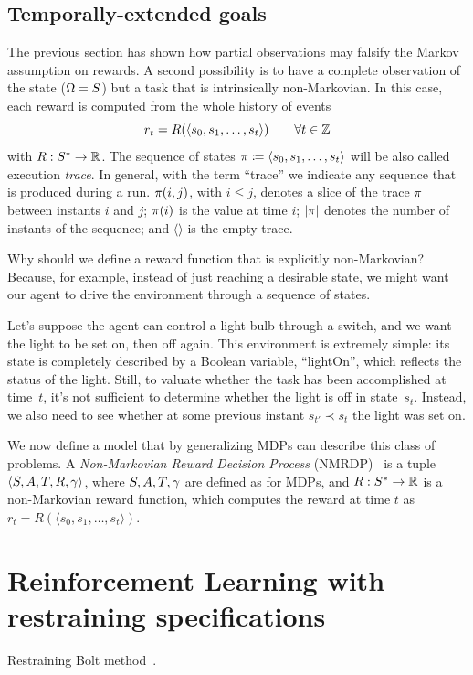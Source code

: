 \subsection{Temporally-extended goals}

The previous section has shown how partial observations may falsify the Markov
assumption on rewards. A second possibility is to have a complete observation
of the state ($\Omega = S$) but a task that is intrinsically
non-Markovian. In this case, each reward is computed from the whole history
of events
\begin{equation}
	r_t = R(\langle s_0, s_1, \dots, s_t \rangle) \qquad \forall t \in \mathbb{Z}
\end{equation}
with $R: S^* \to \mathbb{R}$. The sequence of states $\pi
\coloneqq \langle s_0, s_1, \dots, s_t \rangle$ will be also called
execution \emph{trace}. In general, with the term ``trace'' we indicate any
sequence that is produced during a run. $\pi(i, j)$, with $i \le j$,
denotes a slice of the trace $\pi$ between instants $i$ and $j$;
$\pi(i)$ is the value at time $i$; $\lvert\pi\rvert$ denotes the number of
instants of the sequence; and $\langle \rangle$ is the empty trace.

Why should we define a reward function that is explicitly non-Markovian?
Because, for example, instead of just reaching a desirable state, we might
want our agent to drive the environment through a sequence of states.

\begin{example}
	Let's suppose the agent can control a light bulb through a switch, and we
	want the light to be set on, then off again. This environment is extremely
	simple: its state is completely described by a Boolean variable,
	``lightOn'', which reflects the status of the light. Still, to valuate
	whether the task has been accomplished at time~$t$, it's not sufficient to
	determine whether the light is off in state~$s_t$. Instead, we also need to
	see whether at some previous instant $s_{t'} \prec s_t$ the light was set
	on.
\end{example}

We now define a model that by generalizing MDPs can describe this class of
problems. A \emph{Non-Markovian Reward Decision Process}
(NMRDP)~\cite{bib:nmrdp-logic-first} is a tuple $\langle S, A, T, R,
\gamma \rangle$, where $S, A, T, \gamma$ are defined as for MDPs,
and $R: S^* \to \mathbb{R}$ is a non-Markovian reward function, which computes
the reward at time $t$ as $r_t = R(\langle s_0, s_1, \dots, s_t \rangle)$.




\section{Reinforcement Learning with restraining specifications}

\label{sec:rb}

Restraining Bolt method~\cite{bib:bolt}\cite{bib:rb-imitation-l}.


